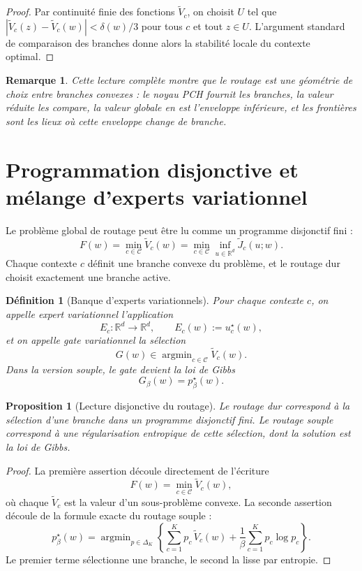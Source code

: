 \documentclass[11pt,a4paper]{article}
\newtheorem{definition}{Définition}[section]
\newtheorem{proposition}{Proposition}[section]
\newtheorem{remark}{Remarque}[section]
\DeclareMathOperator{\argmin}{argmin}
\newcommand{\R}{\mathbb R}
\newcommand{\Ccal}{\mathcal C}
\begin{document}
\begin{proof}
Par continuité finie des fonctions \(\widetilde V_c\), on choisit \(U\) tel que \(|\widetilde V_c(z)-\widetilde V_c(w)|<\delta(w)/3\) pour tous \(c\) et tout \(z\in U\). L'argument standard de comparaison des branches donne alors la stabilité locale du contexte optimal.
\end{proof}

\begin{remark}
Cette lecture complète montre que le routage est une géométrie de choix entre branches convexes : le noyau PCH fournit les branches, la valeur réduite les compare, la valeur globale en est l'enveloppe inférieure, et les frontières sont les lieux où cette enveloppe change de branche.
\end{remark}

\section{Programmation disjonctive et mélange d'experts variationnel}

Le problème global de routage peut être lu comme un programme disjonctif fini :
\[
F(w)=\min_{c\in\Ccal}\widetilde V_c(w)
=
\min_{c\in\Ccal}\inf_{u\in\R^d}\widetilde J_c(u;w).
\]
Chaque contexte \(c\) définit une branche convexe du problème, et le routage dur choisit exactement une branche active.

\begin{definition}[Banque d'experts variationnels]
Pour chaque contexte \(c\), on appelle expert variationnel l'application
\[
E_c:\R^d\to\R^d,\qquad E_c(w):=u_c^\star(w),
\]
et on appelle gate variationnel la sélection
\[
G(w)\in\argmin_{c\in\Ccal}\widetilde V_c(w).
\]
Dans la version souple, le gate devient la loi de Gibbs
\[
G_\beta(w)=p^\star_\beta(w).
\]
\end{definition}

\begin{proposition}[Lecture disjonctive du routage]
Le routage dur correspond à la sélection d'une branche dans un programme disjonctif fini. Le routage souple correspond à une régularisation entropique de cette sélection, dont la solution est la loi de Gibbs.
\end{proposition}

\begin{proof}
La première assertion découle directement de l'écriture
\[
F(w)=\min_{c\in\Ccal}\widetilde V_c(w),
\]
où chaque \(\widetilde V_c\) est la valeur d'un sous-problème convexe. La seconde assertion découle de la formule exacte du routage souple :
\[
p^\star_\beta(w)
=
\argmin_{p\in\Delta_K}
\left\{
\sum_{c=1}^K p_c\,\widetilde V_c(w)
+
\frac{1}{\beta}\sum_{c=1}^K p_c\log p_c
\right\}.
\]
Le premier terme sélectionne une branche, le second la lisse par entropie.
\end{proof}
\end{document}
